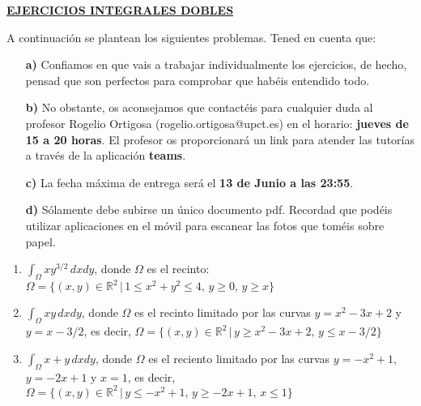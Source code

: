 \documentclass[preprint,12pt]{elsarticle}
\begin{document}
\vspace{15cm}

\begin{center}
\underline{\textbf{EJERCICIOS INTEGRALES DOBLES}}
\end{center}


A continuaci\'on se plantean los siguientes problemas. Tened en cuenta que:

\begin{itemize}
	\item [\textbf{a)}] Confiamos en que vais a trabajar individualmente los ejercicios, de hecho, pensad que son perfectos para comprobar que hab\'eis entendido todo.
	\item [\textbf{b)}]  No obstante, os aconsejamos que contact\'eis para cualquier duda al profesor Rogelio Ortigosa ({\textcolor[rgb]{0,0,1}{rogelio.ortigosa@upct.es}}) en el horario: \textbf{jueves de 15 a 20 horas}. El profesor os proporcionar\'a un link para atender las tutor\'ias a trav\'es de la aplicaci\'on \textbf{teams}.
	
	\item [\textbf{c)}] La {fecha m\'axima de entrega} ser\'a el \textbf{13 de Junio a las 23:55}.
	
	\item [\textbf{d)}] S\'olamente debe subirse un \'unico documento pdf. Recordad que pod\'eis utilizar aplicaciones en el m\'ovil para escanear las fotos que tom\'eis sobre papel.


\end{itemize}


\vspace{2mm}

\begin{enumerate}
	\item $\int_{\Omega}x y^{3/2}\,dxdy$, donde $\Omega$ es el recinto: $\Omega=\{(x,y)\in\mathbb{R}^2\,\vert\, 1\leq x^2+y^2\leq 4,\,y\geq 0,\,y\geq x\}$
	
	\vspace{4mm}
	
	\item $\int_{\Omega}x y\,dxdy$, donde $\Omega$ es el recinto limitado por las curvas $y=x^2-3x+2$ y $y=x-3/2$, es decir, $\Omega=\{(x,y)\in\mathbb{R}^2\,\vert\, y\geq x^2-3x+2,\,y\leq x-3/2\}$
	
	
	\vspace{4mm}
	
	\item $\int_{\Omega}x+y\,dxdy$, donde $\Omega$ es el reciento limitado por las curvas $y=-x^2+1$, $y=-2x+1$ y $x=1$, es decir, $\Omega=\{(x,y)\in\mathbb{R}^2\,\vert\, y\leq -x^2+1,\,y\geq -2x+1,\,x\leq 1\}$
	

\end{enumerate}






%


\end{document}
